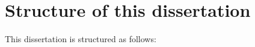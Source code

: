 
    


\section{Structure of this dissertation}\label{sec:intro-structure}
This dissertation is structured as follows:

